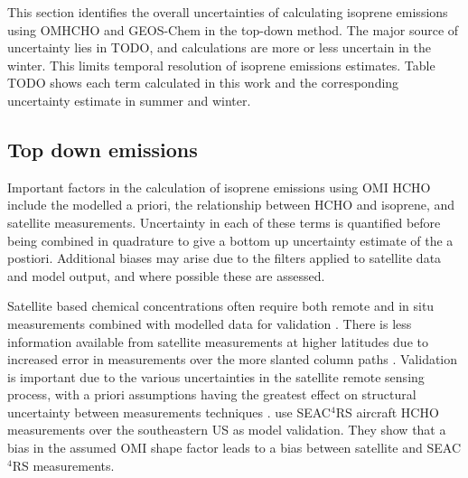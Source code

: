     This section identifies the overall uncertainties of calculating isoprene emissions using OMHCHO and GEOS-Chem in the top-down method.
    The major source of uncertainty lies in TODO, and calculations are more or less uncertain in the winter.
    This limits temporal resolution of isoprene emissions estimates.
    Table TODO shows each term calculated in this work and the corresponding uncertainty estimate in summer and winter.
    
    
  
  \subsection{Top down emissions}
    \label{BioIsop:uncertainty:eomi}
    Important factors in the calculation of isoprene emissions using OMI HCHO include the modelled a priori, the relationship between HCHO and isoprene, and satellite measurements.
    Uncertainty in each of these terms is quantified before being combined in quadrature to give a bottom up uncertainty estimate of the a postiori.
    Additional biases may arise due to the filters applied to satellite data and model output, and where possible these are assessed. 
    
    Satellite based chemical concentrations often require both remote and in situ measurements combined with modelled data for validation \parencite{Marais2014}.
    There is less information available from satellite measurements at higher latitudes due to increased error in measurements over the more slanted column paths \parencite{DeSmedt2015}.
    Validation is important due to the various uncertainties in the satellite remote sensing process, with a priori assumptions having the greatest effect on structural uncertainty between measurements techniques \textcite{Lorente2017}.
    \textcite{Zhu2016} use SEAC$^4$RS aircraft HCHO measurements over the southeastern US as model validation. 
    They show that a bias in the assumed OMI shape factor leads to a bias between satellite and SEAC$^4$RS measurements.
    
